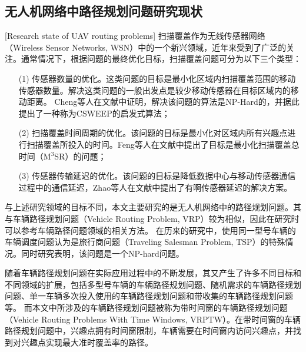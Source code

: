 \subsection{无人机网络中路径规划问题研究现状}[Research state of UAV routing problems]
扫描覆盖作为无线传感器网络（Wireless Sensor Networks, WSN）中的一个新兴领域，近年来受到了广泛的关注。通常情况下，根据问题的最终优化目标，扫描覆盖问题可分为以下三个类型：
\begin{itemize}
  \item [(1)] 传感器数量的优化。这类问题的目标是最小化区域内扫描覆盖范围的移动传感器数量。解决这类问题的一般出发点是较少移动传感器在目标区域内的移动距离。
  Cheng等人在文献中证明，解决该问题的算法是NP-Hard的，并据此提出了一种称为CSWEEP的启发式算法\cite{2008Sweep}；
  \item [(2)] 扫描覆盖时间周期的优化。该问题的目标是最小化对区域内所有兴趣点进行扫描覆盖所投入的时间。Feng等人在文献中提出了目标是最小化扫描覆盖总时间（M$^3$SR）的问题\cite{2015Shorten}；
  \item [(3)] 传感器传输延迟的优化。该问题的目标是降低数据中心与移动传感器通信过程中的通信延迟，Zhao等人在文献中提出了有啊传感器延迟的解决方案\cite{2012zhao}。
\end{itemize}


与上述研究领域的目标不同，本文主要研究的是无人机网络中的路径规划问题。其与车辆路径规划问题（Vehicle Routing Problem, VRP）较为相似，因此在研究时可以参考车辆路径问题领域的相关方法。
在历来的研究中，使用同一型号车辆的车辆调度问题认为是旅行商问题（Traveling Salesman Problem, TSP）的特殊情况\cite{bektas2006multiple}。同时研究表明，该问题是一个NP-hard问题\cite{lenstra1981complexity}。


随着车辆路径规划问题在实际应用过程中的不断发展，其又产生了许多不同目标和不同领域的扩展，包括多型号车辆的车辆路径规划问题\cite{pan2021multi}、随机需求的车辆路径规划问题\cite{saint2021time}、单一车辆多次投入使用的车辆路径规划问题\cite{euchi2021hybrid}和带收集的车辆路径规划问题\cite{fan2021time}等。
而本文中所涉及的车辆路径规划问题被称为带时间窗的车辆路径规划问题（Vehicle Routing Problems With Time Windows, VRPTW）。在带时间窗的车辆路径规划问题中，兴趣点拥有时间窗限制，车辆需要在时间窗内访问兴趣点，并找到对兴趣点实现最大准时覆盖率的路径\cite{ren2022vehicle}。


